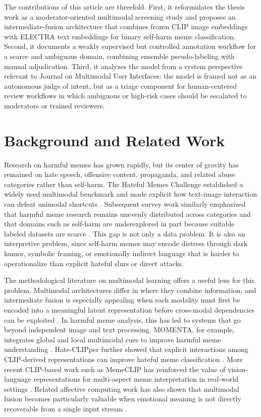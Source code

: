 \documentclass[pdflatex,sn-mathphys-num]{sn-jnl}%
\theoremstyle{thmstyleone}%
\theoremstyle{thmstyletwo}%
\theoremstyle{thmstylethree}%
\begin{document}
The contributions of this article are threefold. First, it reformulates the thesis work as a moderator-oriented multimodal screening study and proposes an intermediate-fusion architecture that combines frozen CLIP image embeddings with ELECTRA text embeddings for binary self-harm meme classification. Second, it documents a weakly supervised but controlled annotation workflow for a scarce and ambiguous domain, combining ensemble pseudo-labeling with manual adjudication. Third, it analyzes the model from a system perspective relevant to Journal on Multimodal User Interfaces: the model is framed not as an autonomous judge of intent, but as a triage component for human-centered review workflows in which ambiguous or high-risk cases should be escalated to moderators or trained reviewers.

\section{Background and Related Work}\label{sec:background-related-work}

Research on harmful memes has grown rapidly, but its center of gravity has remained on hate speech, offensive content, propaganda, and related abuse categories rather than self-harm. The Hateful Memes Challenge established a widely used multimodal benchmark and made explicit how text-image interaction can defeat unimodal shortcuts \cite{bib6}. Subsequent survey work similarly emphasized that harmful meme research remains unevenly distributed across categories and that domains such as self-harm are underexplored in part because suitable labeled datasets are scarce \cite{bib7}. This gap is not only a data problem. It is also an interpretive problem, since self-harm memes may encode distress through dark humor, symbolic framing, or emotionally indirect language that is harder to operationalize than explicit hateful slurs or direct attacks.

The methodological literature on multimodal learning offers a useful lens for this problem. Multimodal architectures differ in where they combine information, and intermediate fusion is especially appealing when each modality must first be encoded into a meaningful latent representation before cross-modal dependencies can be exploited \cite{bib8}. In harmful meme analysis, this has led to systems that go beyond independent image and text processing. MOMENTA, for example, integrates global and local multimodal cues to improve harmful meme understanding \cite{bib14}. Hate-CLIPper further showed that explicit interactions among CLIP-derived representations can improve hateful meme classification \cite{bib12}. More recent CLIP-based work such as MemeCLIP has reinforced the value of vision-language representations for multi-aspect meme interpretation in real-world settings \cite{bib13}. Related affective computing work has also shown that multimodal fusion becomes particularly valuable when emotional meaning is not directly recoverable from a single input stream \cite{bib15}.
\end{document}

